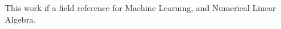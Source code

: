 This work if a field reference for Machine Learning, and Numerical Linear Algebra.

\smallskip






